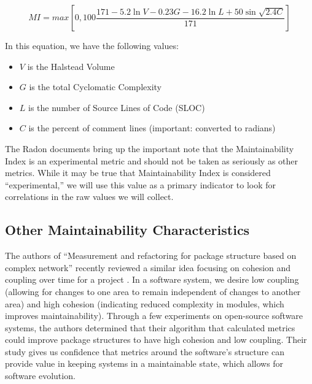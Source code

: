$$
MI = max[0, 100\frac{171 - 5.2 \ln{V} - 0.23G - 16.2 \ln{L} + 50 \sin{\sqrt{2.4C}}}{171}]
$$

In this equation, we have the following values:
\begin{singlespace}
  \begin{itemize}
    \item $V$ is the Halstead Volume
    \item $G$ is the total Cyclomatic Complexity
    \item $L$ is the number of Source Lines of Code (SLOC)
    \item $C$ is the percent of comment lines (important: converted to radians)
  \end{itemize}    
\end{singlespace}

The Radon documents bring up the important note that the Maintainability Index is an experimental metric and should not be taken as seriously as other metrics. While it may be true that Maintainability Index is considered ``experimental,'' we will use this value as a primary indicator to look for correlations in the raw values we will collect.


\subsection{Other Maintainability Characteristics} \label{subOtherCharacteristics}

The authors of ``Measurement and refactoring for package structure based on complex network'' recently reviewed a similar idea focusing on cohesion and coupling over time for a project \cite{zhou:2020}. In a software system, we desire low coupling (allowing for changes to one area to remain independent of changes to another area) and high cohesion (indicating reduced complexity in modules, which improves maintainability). Through a few experiments on open-source software systems, the authors determined that their algorithm that calculated metrics could improve package structures to have high cohesion and low coupling. Their study gives us confidence that metrics around the software's structure can provide value in keeping systems in a maintainable state, which allows for software evolution.

